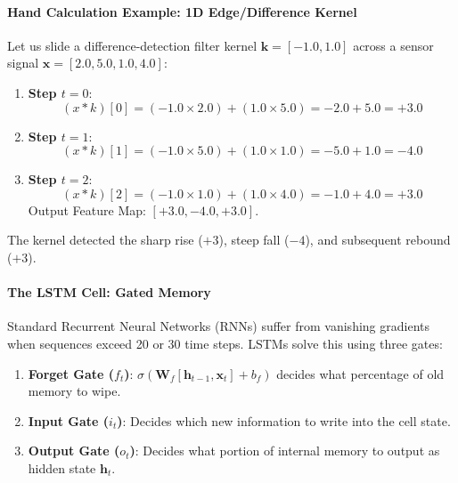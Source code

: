 \paragraph{Hand Calculation Example: 1D Edge/Difference Kernel}
Let us slide a difference-detection filter kernel $\mathbf{k} = [-1.0, 1.0]$ across a sensor signal $\mathbf{x} = [2.0, 5.0, 1.0, 4.0]$:
\begin{enumerate}
    \item \textbf{Step $t=0$}:
    \begin{equation*}
    (x * k)[0] = (-1.0 \times 2.0) + (1.0 \times 5.0) = -2.0 + 5.0 = \mathbf{+3.0}
    \end{equation*}
    \item \textbf{Step $t=1$}:
    \begin{equation*}
    (x * k)[1] = (-1.0 \times 5.0) + (1.0 \times 1.0) = -5.0 + 1.0 = \mathbf{-4.0}
    \end{equation*}
    \item \textbf{Step $t=2$}:
    \begin{equation*}
    (x * k)[2] = (-1.0 \times 1.0) + (1.0 \times 4.0) = -1.0 + 4.0 = \mathbf{+3.0}
    \end{equation*}
    Output Feature Map: $[+3.0, -4.0, +3.0]$.
\end{enumerate}
The kernel detected the sharp rise ($+3$), steep fall ($-4$), and subsequent rebound ($+3$).

\paragraph{The LSTM Cell: Gated Memory}
Standard Recurrent Neural Networks (RNNs) suffer from vanishing gradients when sequences exceed 20 or 30 time steps. LSTMs solve this using three gates:
\begin{enumerate}
    \item \textbf{Forget Gate ($f_t$)}: $\sigma(\mathbf{W}_f [\mathbf{h}_{t-1}, \mathbf{x}_t] + b_f)$ decides what percentage of old memory to wipe.
    \item \textbf{Input Gate ($i_t$)}: Decides which new information to write into the cell state.
    \item \textbf{Output Gate ($o_t$)}: Decides what portion of internal memory to output as hidden state $\mathbf{h}_t$.
\end{enumerate}

